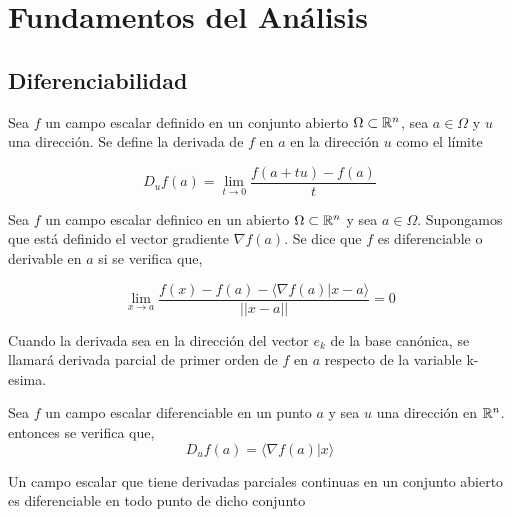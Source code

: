 \newpage 
\section{Fundamentos del Análisis}

\subsection{Diferenciabilidad}

    \begin{definicion}
    Sea $f$ un campo escalar definido en un conjunto abierto  $\Omega \subset \mathbb{R}^n$, sea $a \in \Omega$ y $u$ una dirección. Se define la derivada de $f$ en $a$ en la dirección $u$ como el límite
    
    \begin{equation}
        D_{u}f(a) = \underset{t \to 0}{\lim} \frac{f(a + tu) - f(a)}{t}
    \end{equation}
    \end{definicion}

    \begin{definicion}
    Sea $f$ un campo escalar definico en un abierto $\Omega \subset \mathbb{R}^n$ y sea $a \in \Omega$. Supongamos que está definido el vector gradiente $\nabla f(a)$. Se dice que $f$ es diferenciable o derivable en $a$ si se verifica que,
    
    \begin{equation}
        \underset{x \to a}{\lim} \frac{f(x) - f(a) - \langle \nabla f(a) | x - a \rangle}{||x - a||} = 0
    \end{equation}
    \end{definicion}
    
    Cuando la derivada sea en la dirección del vector $e_k$ de la base canónica, se llamará derivada parcial de primer orden de $f$ en $a$ respecto de la variable k-esima. \\
    
    \begin{proposicion}
    Sea $f$ un campo escalar diferenciable en un punto $a$ y sea $u$ una dirección en $\mathbb{R}^n$. entonces se verifica que,
    \begin{equation}
        D_{u} f(a) = \langle \nabla f(a) | x \rangle
    \end{equation}
    \end{proposicion}
    
    \begin{teorema}
    Un campo escalar que tiene derivadas parciales continuas en un conjunto abierto es diferenciable en todo punto de dicho conjunto
    \end{teorema}

